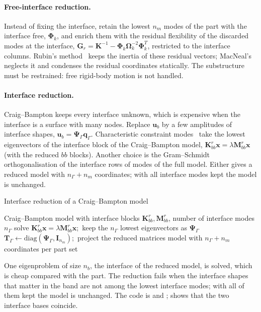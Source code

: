 \paragraph{Free-interface reduction.}
Instead of fixing the interface, retain the lowest $n_m$ modes of the part with the interface free, $\bm\Phi_k$, and enrich them with the residual flexibility of the discarded modes at the interface, $\bm G_r=\bm K^{-1}-\bm\Phi_k\bm\Omega_k^{-2}\bm\Phi_k^T$, restricted to the interface columns. Rubin's method~\cite{rubin1975} keeps the inertia of these residual vectors; MacNeal's~\cite{macneal1971} neglects it and condenses the residual coordinates statically. The substructure must be restrained: free rigid-body motion is not handled.

\paragraph{Interface reduction.}
Craig--Bampton keeps every interface unknown, which is expensive when the interface is a surface with many nodes. Replace $\bm u_b$ by a few amplitudes of interface shapes, $\bm u_b=\bm\Psi_\Gamma\bm q_\Gamma$. Characteristic constraint modes~\cite{castanier2001} take the lowest eigenvectors of the interface block of the Craig--Bampton model, $\bm K_{bb}^{r}\bm x=\lambda\bm M_{bb}^{r}\bm x$ (with the reduced $bb$ blocks). Another choice is the Gram--Schmidt orthogonalisation of the interface rows of modes of the full model. Either gives a reduced model with $n_\Gamma+n_m$ coordinates; with all interface modes kept the model is unchanged.

\begin{algbox}{Interface reduction of a Craig--Bampton model}
\begin{pseudo}
\Require Craig--Bampton model with interface blocks $\bm K^r_{bb},\bm M^r_{bb}$, number of interface modes $n_\Gamma$
\State solve $\bm K^r_{bb}\bm x=\lambda\bm M^r_{bb}\bm x$;\ keep the $n_\Gamma$ lowest eigenvectors as $\bm\Psi_\Gamma$ 
\State $\bm T_\Gamma\gets\mathrm{diag}(\bm\Psi_\Gamma,\bm I_{n_m})$;\ project the reduced matrices
\Ensure model with $n_\Gamma+n_m$ coordinates per part set
\end{pseudo}
\end{algbox}

One eigenproblem of size $n_b$, the interface of the reduced model, is solved, which is cheap compared with the part. The reduction fails when the interface shapes that matter in the band are not among the lowest interface modes; with all of them kept the model is unchanged. The code is  and ;  shows that the two interface bases coincide.

